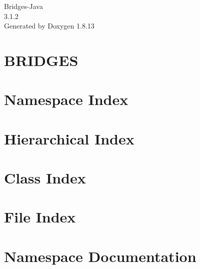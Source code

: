 \documentclass[twoside]{book}
\newcommand{\+}{\discretionary{\mbox{\scriptsize$\hookleftarrow$}}{}{}}
\newcommand{\clearemptydoublepage}{%
  \newpage{\pagestyle{empty}\cleardoublepage}%
}
\begin{document}
\hypersetup{pageanchor=false,
             bookmarksnumbered=true,
             pdfencoding=unicode
            }
\begin{titlepage}
\vspace*{7cm}
\begin{center}%
{\Large Bridges-\/\+Java \\[1ex]\large 3.\+1.\+2 }\\
\vspace*{1cm}
{\large Generated by Doxygen 1.8.13}\\
\end{center}
\end{titlepage}
\clearemptydoublepage
{}
\tableofcontents
\clearemptydoublepage
{}
\hypersetup{pageanchor=true}

\chapter{B\+R\+I\+D\+G\+ES}
\label{index}\hypertarget{index}{}
\chapter{Namespace Index}

\chapter{Hierarchical Index}

\chapter{Class Index}

\chapter{File Index}

\chapter{Namespace Documentation}







\end{document}
